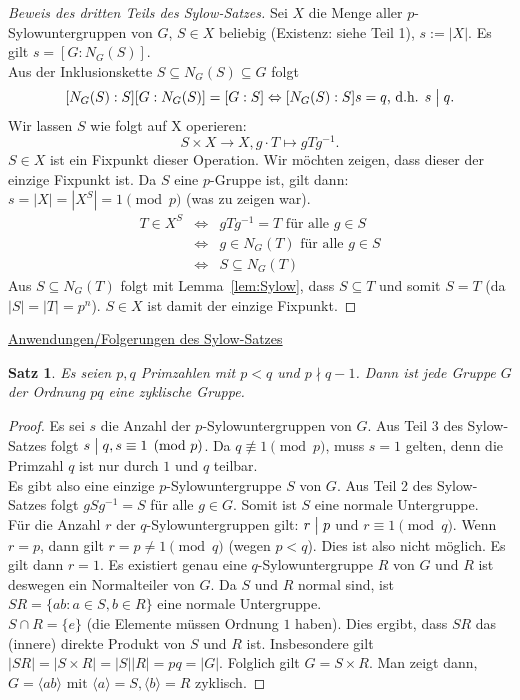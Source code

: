 \documentclass[12pt]{scrartcl} %
\newcommand{\divides}{\bigm|}
\newtheorem{thm}{Satz}
\theoremstyle{definition}
\theoremstyle{remark}
\begin{document}
\begin{proof}[Beweis des dritten Teils des Sylow-Satzes]
	Sei $X$ die Menge aller $p$-Sylowuntergruppen von $G$, $S \in X$ beliebig (Existenz: siehe Teil 1), $s := |X|$. Es gilt $s = [G:N_G(S)]$. \\
	Aus der Inklusionskette $S \subseteq N_G(S) \subseteq G$ folgt
	$$[N_G(S):S] [G:N_G(S)] = [G:S] \Leftrightarrow [N_G(S):S] s = q \text{, d.h. } s \divides q.$$
	Wir lassen $S$ wie folgt auf X operieren:
	$$S \times X \rightarrow X, g \cdot T \mapsto gTg^{-1}.$$
	$S \in X$ ist ein Fixpunkt dieser Operation. Wir möchten zeigen, dass dieser der einzige Fixpunkt ist. Da $S$ eine $p$-Gruppe ist, gilt dann: $s = |X| = |X^S| = 1 \pmod{p}$ (was zu zeigen war).
	\begin{align*}
		T \in X^S &\Leftrightarrow &gTg^{-1} = T \text{ für alle } g \in S \\
		&\Leftrightarrow &g \in N_G(T) \text{ für alle } g \in S \\
		&\Leftrightarrow &S \subseteq N_G(T)
	\end{align*}
	Aus $S \subseteq N_G(T)$ folgt mit Lemma~\ref{lem:Sylow}, dass $S \subseteq T$ und somit $S = T$ (da $|S| = |T| = p^n$). $S \in X$ ist damit der einzige Fixpunkt.
\end{proof}

\underline{Anwendungen/Folgerungen des Sylow-Satzes}

\begin{thm}
	Es seien $p, q$ Primzahlen mit $p < q$ und $p \nmid q-1$. Dann ist jede Gruppe $G$ der Ordnung $pq$ eine zyklische Gruppe.
\end{thm}

\begin{proof}
	Es sei $s$ die Anzahl der $p$-Sylowuntergruppen von $G$. Aus Teil 3 des Sylow-Satzes folgt $s \divides q, s \equiv 1 \pmod{p}$. Da $q \not \equiv 1 \pmod{p}$, muss $s = 1$ gelten, denn die Primzahl $q$ ist nur durch $1$ und $q$ teilbar. \\
	Es gibt also eine einzige $p$-Sylowuntergruppe $S$ von $G$. Aus Teil 2 des Sylow-Satzes folgt $gSg^{-1} = S$ für alle $g \in G$. Somit ist $S$ eine normale Untergruppe. \\
	Für die Anzahl $r$ der $q$-Sylowuntergruppen gilt: $r \divides p$ und $r \equiv 1 \pmod{q}$. Wenn $r = p$, dann gilt $r = p \not = 1 \pmod{q}$ (wegen $p < q$). Dies ist also nicht möglich. Es gilt dann $r = 1$. Es existiert genau eine $q$-Sylowuntergruppe $R$ von $G$ und $R$ ist deswegen ein Normalteiler von $G$. Da $S$ und $R$ normal sind, ist $SR = \{ ab : a \in S, b \in R\}$ eine normale Untergruppe. \\
	$S \cap R = \{ e\}$ (die Elemente müssen Ordnung $1$ haben). Dies ergibt, dass $SR$ das (innere) direkte Produkt von $S$ und $R$ ist. Insbesondere gilt $|SR| = |S \times R| = |S||R| = pq = |G|$. Folglich gilt $G = S \times R$. Man zeigt dann, $G = \langle ab \rangle \text{ mit } \langle a \rangle = S, \langle b \rangle = R$ zyklisch.
\end{proof}
\end{document}
